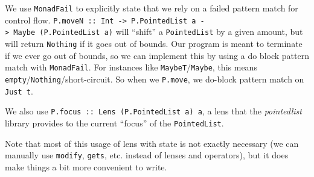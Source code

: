 \documentclass[]{article}
\newenvironment{Shaded}{}{}
\newcommand{\KeywordTok}[1]{\textcolor[rgb]{0.00,0.44,0.13}{\textbf{#1}}}
\newcommand{\DataTypeTok}[1]{\textcolor[rgb]{0.56,0.13,0.00}{#1}}
\newcommand{\DecValTok}[1]{\textcolor[rgb]{0.25,0.63,0.44}{#1}}
\newcommand{\CommentTok}[1]{\textcolor[rgb]{0.38,0.63,0.69}{\textit{#1}}}
\newcommand{\OtherTok}[1]{\textcolor[rgb]{0.00,0.44,0.13}{#1}}
\newcommand{\FunctionTok}[1]{\textcolor[rgb]{0.02,0.16,0.49}{#1}}
\newcommand{\NormalTok}[1]{#1}
\begin{document}
\begin{Shaded}
\end{Shaded}

We use \texttt{MonadFail} to explicitly state that we rely on a failed pattern
match for control flow.
\texttt{P.moveN\ ::\ Int\ -\textgreater{}\ P.PointedList\ a\ -\textgreater{}\ Maybe\ (P.PointedList\ a)}
will ``shift'' a \texttt{PointedList} by a given amount, but will return
\texttt{Nothing} if it goes out of bounds. Our program is meant to terminate if
we ever go out of bounds, so we can implement this by using a do block pattern
match with \texttt{MonadFail}. For instances like
\texttt{MaybeT}/\texttt{Maybe}, this means
\texttt{empty}/\texttt{Nothing}/short-circuit. So when we \texttt{P.move}, we
do-block pattern match on \texttt{Just\ t\textquotesingle{}}.

We also use \texttt{P.focus\ ::\ Lens\textquotesingle{}\ (P.PointedList\ a)\ a},
a lens that the \emph{pointedlist} library provides to the current ``focus'' of
the \texttt{PointedList}.

Note that most of this usage of lens with state is not exactly necessary (we can
manually use \texttt{modify}, \texttt{gets}, etc. instead of lenses and
operators), but it does make things a bit more convenient to write.
\end{document}
